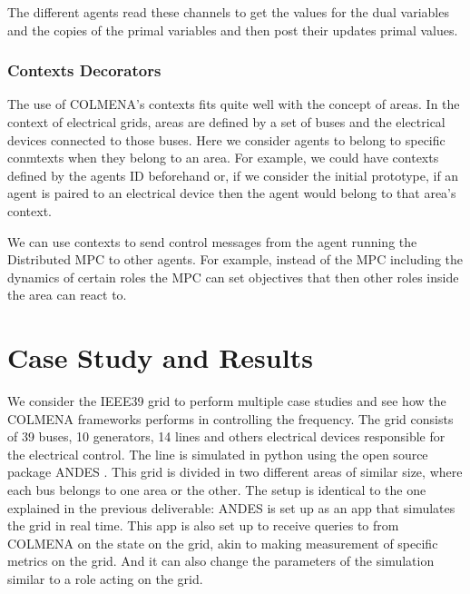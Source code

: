 \documentclass{article}
\begin{document}
The different agents read these channels to get the values for the dual variables and the copies of the primal variables and then post their updates primal values.

\subsubsection*{Contexts Decorators}

The use of COLMENA's contexts fits quite well with the concept of areas. In the context of electrical grids, areas are defined  by a set of buses and the electrical devices connected to those buses. Here we consider agents to belong to specific conmtexts when they belong to an area. For example, we could have contexts defined by the agents ID beforehand or, if we consider the initial prototype, if an agent is paired to an electrical device then the agent would belong to that area's context.

We can use contexts to send control messages from the agent running the Distributed MPC to other agents. For example, instead of the MPC including the dynamics of certain roles the MPC can set objectives that then other roles inside the area can react to. 

\section{Case Study and Results}

We consider the IEEE39 \cite{grids:ieee39} grid to perform multiple case studies and see how the COLMENA frameworks performs in controlling the frequency. The grid consists of 39 buses, 10 generators, 14 lines and others electrical devices responsible for the electrical control. The line is simulated in python using the open source package ANDES \cite{grids:models}. This grid is divided in two different areas of similar size, where each bus belongs to one area or the other. The setup is identical to the one explained in the previous deliverable: ANDES is set up as an app that simulates the grid in real time. This app is also set up to receive queries to from COLMENA on the state on the grid, akin to making measurement of specific metrics on the grid. And it can also change the parameters of the simulation similar to a role acting on the grid.
\end{document}
